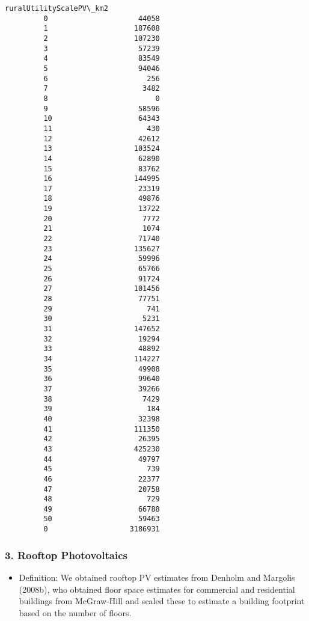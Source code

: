\documentclass[11pt]{article}
\providecommand{\tightlist}{%
      \setlength{\itemsep}{0pt}\setlength{\parskip}{0pt}}
\begin{document}
\begin{Verbatim}[commandchars=\\\{\}]
             ruralUtilityScalePV\_km2  
         0                     44058  
         1                    187608  
         2                    107230  
         3                     57239  
         4                     83549  
         5                     94046  
         6                       256  
         7                      3482  
         8                         0  
         9                     58596  
         10                    64343  
         11                      430  
         12                    42612  
         13                   103524  
         14                    62890  
         15                    83762  
         16                   144995  
         17                    23319  
         18                    49876  
         19                    13722  
         20                     7772  
         21                     1074  
         22                    71740  
         23                   135627  
         24                    59996  
         25                    65766  
         26                    91724  
         27                   101456  
         28                    77751  
         29                      741  
         30                     5231  
         31                   147652  
         32                    19294  
         33                    48892  
         34                   114227  
         35                    49908  
         36                    99640  
         37                    39266  
         38                     7429  
         39                      184  
         40                    32398  
         41                   111350  
         42                    26395  
         43                   425230  
         44                    49797  
         45                      739  
         46                    22377  
         47                    20758  
         48                      729  
         49                    66788  
         50                    59463  
         0                   3186931  
\end{Verbatim}
            
    \subsubsection{3. Rooftop Photovoltaics}\label{rooftop-photovoltaics}

\begin{itemize}
\tightlist
\item
  Definition: We obtained rooftop PV estimates from Denholm and Margolis
  (2008b), who obtained floor space estimates for commercial and
  residential buildings from McGraw-Hill and scaled these to estimate a
  building footprint based on the number of floors.
\end{itemize}
\end{document}
